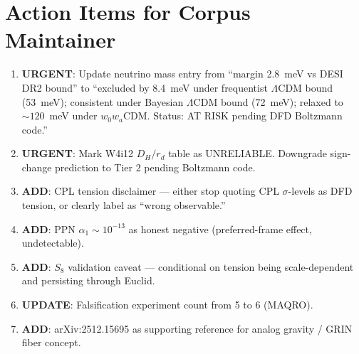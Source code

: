 \documentclass[11pt]{article}
\newcommand{\LCDM}{$\Lambda$CDM}
\begin{document}
\section*{Action Items for Corpus Maintainer}

\begin{enumerate}
\item \textbf{URGENT}: Update neutrino mass entry from ``margin 2.8~meV
  vs DESI DR2 bound'' to ``excluded by 8.4~meV under frequentist
  \LCDM{} bound (53~meV); consistent under Bayesian \LCDM{} bound
  (72~meV); relaxed to $\sim 120$~meV under $w_0 w_a$CDM.  Status:
  AT RISK pending DFD Boltzmann code.''

\item \textbf{URGENT}: Mark W4i12 $D_H/r_d$ table as UNRELIABLE.
  Downgrade sign-change prediction to Tier 2 pending Boltzmann code.

\item \textbf{ADD}: CPL tension disclaimer --- either stop quoting
  CPL $\sigma$-levels as DFD tension, or clearly label as ``wrong
  observable.''

\item \textbf{ADD}: PPN $\alpha_1 \sim 10^{-13}$ as honest negative
  (preferred-frame effect, undetectable).

\item \textbf{ADD}: $S_8$ validation caveat --- conditional on tension
  being scale-dependent and persisting through Euclid.

\item \textbf{UPDATE}: Falsification experiment count from 5 to 6
  (MAQRO).

\item \textbf{ADD}: arXiv:2512.15695 as supporting reference for
  analog gravity / GRIN fiber concept.
\end{enumerate}
\end{document}
